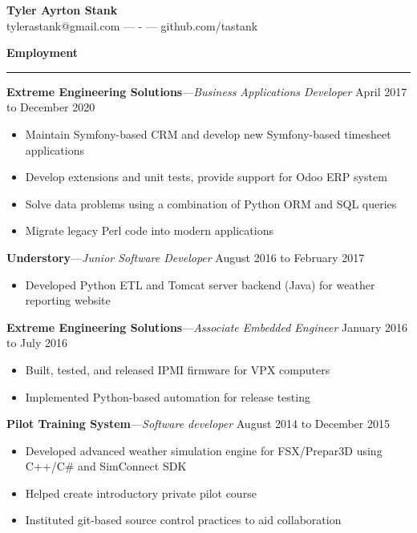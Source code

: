 \documentclass[12pt,letterpaper]{article}
\newenvironment{details}{
    \vspace{-.8em}
    \begin{itemize}
        \renewcommand \labelitemi{\labelitemiv}
        \setlength{\itemsep}{0pt}
        \setlength{\parskip}{-1pt}
        \setlength{\parsep}{0pt}
    }{
    \end{itemize}
    \vspace{-.5em}
}
\newcommand{\hr} {
    \vspace{-1em}
    \par\rule{\textwidth}{1pt}
    \vspace{-1.5em}
}
\newcommand{\ressection}[1] {
    \par{\large \textbf{#1}}
    \hr
}
\newenvironment{employment} {
    \setlength{\parskip}{0pt}
    \ressection{Employment}
}{
    \vspace{0.5em}
}
\newcommand{\employer}[3] {
    \vspace{3pt}
    {\par\textbf{#1}---\textit{#2} \hfill #3}
    \vspace{3pt}
    \par
}
\begin{document}
\thispagestyle{empty}

\begin{centering}
    {\huge \textbf{Tyler Ayrton Stank}}\\
    tylerastank@gmail.com ---  - --- github.com/tastank\\
\end{centering}


\begin{employment} 

\employer{Extreme Engineering Solutions}{Business Applications Developer}{April 2017 to December 2020}
\begin{details}
    \item Maintain Symfony-based CRM and develop new Symfony-based timesheet applications
    \item Develop extensions and unit tests, provide support for Odoo ERP system
    \item Solve data problems using a combination of Python ORM and SQL queries
    \item Migrate legacy Perl code into modern applications
\end{details}

\employer{Understory}{Junior Software Developer}{August 2016 to February 2017}
\begin{details}
    \item Developed Python ETL and Tomcat server backend (Java) for weather reporting website
\end{details}

\employer{Extreme Engineering Solutions}{Associate Embedded Engineer}{January 2016 to July 2016}
\begin{details}
    \item Built, tested, and released IPMI firmware for VPX computers
    \item Implemented Python-based automation for release testing
\end{details}

\employer{Pilot Training System}{Software developer}{August 2014 to December 2015}
\begin{details}
    \item Developed advanced weather simulation engine for FSX/Prepar3D using C++/C\# and SimConnect SDK
    \item Helped create introductory private pilot course
    \item Instituted git-based source control practices to aid collaboration
\end{details}


\end{employment}
\end{document}
